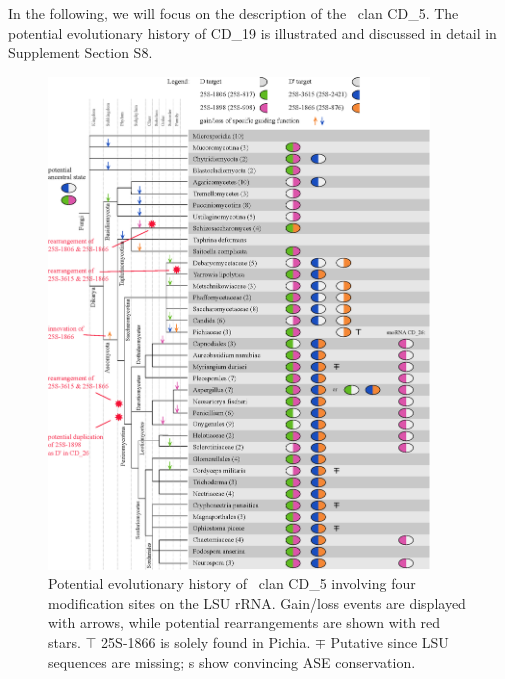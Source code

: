 In the following, we will focus on the description of the \sno\ clan
CD\_5. The potential evolutionary history of CD\_19 is illustrated and
discussed in detail in Supplement Section S8.

\begin{figure}
  \centering
  \includegraphics[width=0.9\textwidth]{pics/target_switches_CD_5.eps}
  \caption[Potential evolutionary history of \sno\ clan
  CD\_5.]{Potential evolutionary history of \sno\ clan CD\_5 involving
    four modification sites on the LSU rRNA. Gain/loss events are
    displayed with arrows, while potential rearrangements are shown
    with red stars. $\top$ 25S-1866 is solely found in Pichia. $\mp$
    Putative since LSU sequences are missing; \sno s show convincing
    ASE conservation.}
  \label{fig:CD_5}
\end{figure}

